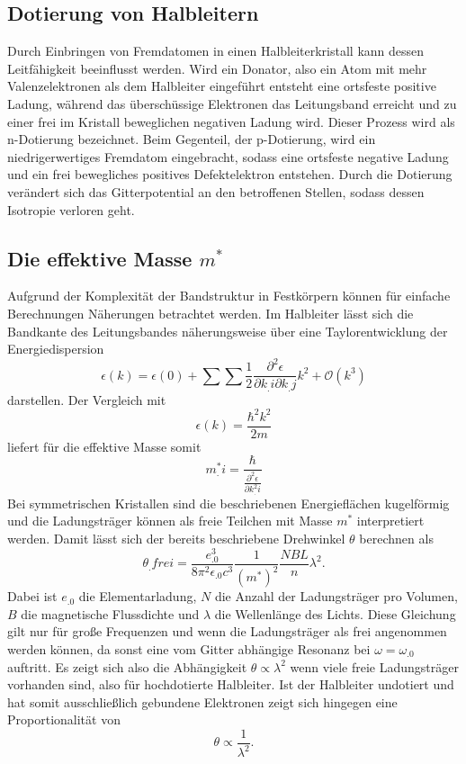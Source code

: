 \subsection{Dotierung von Halbleitern}
Durch Einbringen von Fremdatomen in einen Halbleiterkristall kann dessen Leitfähigkeit beeinflusst werden. Wird ein Donator, also ein Atom mit mehr Valenzelektronen als dem Halbleiter eingeführt entsteht eine ortsfeste positive Ladung, während das überschüssige Elektronen das Leitungsband erreicht und zu einer frei im Kristall beweglichen negativen Ladung wird. Dieser Prozess wird als n-Dotierung bezeichnet. Beim Gegenteil, der p-Dotierung, wird ein niedrigerwertiges Fremdatom eingebracht, sodass eine ortsfeste negative Ladung und ein frei bewegliches positives Defektelektron entstehen. Durch die Dotierung verändert sich das Gitterpotential an den betroffenen Stellen, sodass dessen Isotropie verloren geht.

\subsection{Die effektive Masse $m^*$}
Aufgrund der Komplexität der Bandstruktur in Festkörpern können für einfache Berechnungen Näherungen betrachtet werden.
Im Halbleiter lässt sich die Bandkante des Leitungsbandes näherungsweise über eine Taylorentwicklung der Energiedispersion
\begin{equation*}
\epsilon(k) = \epsilon(0) + \sum\sum\frac{1}{2}\frac{\partial^2\epsilon}{\partial k_.i\partial k_.j}k^2 + \mathcal{O}(k^3)
\end{equation*}
darstellen.
Der Vergleich mit
\[
\epsilon(k) = \frac{\hbar^2k^2}{2m}
\]
liefert für die effektive Masse somit
\begin{equation}
m^*_.i = \frac{\hbar}{\frac{\partial^2\epsilon}{\partial k^2_.i}}\label{eq:mstar}
\end{equation}
Bei symmetrischen Kristallen sind die beschriebenen Energieflächen kugelförmig und die Ladungsträger können als freie Teilchen mit Masse $m^*$ interpretiert werden.
Damit lässt sich der bereits beschriebene Drehwinkel $\theta$ berechnen als
\begin{equation}
\theta_.{frei} = \frac{e^3_.0}{8\pi^2\epsilon_.0c^3}\frac{1}{(m^*)^2}\frac{NBL}{n}\lambda^2\text{.}\label{eq:theta2}
\end{equation}
Dabei ist $e_.0$ die Elementarladung, $N$ die Anzahl der Ladungsträger pro Volumen, $B$ die magnetische Flussdichte und $\lambda$ die Wellenlänge des Lichts.
Diese Gleichung gilt nur für große Frequenzen und wenn die Ladungsträger als frei angenommen werden können, da sonst eine vom Gitter abhängige Resonanz bei $\omega=\omega_.0$ auftritt.
Es zeigt sich also die Abhängigkeit $\theta\propto \lambda^2$ wenn viele freie Ladungsträger vorhanden sind, also für hochdotierte Halbleiter. Ist der Halbleiter undotiert und hat somit ausschließlich gebundene Elektronen zeigt sich hingegen eine Proportionalität von
\begin{equation}
\theta\propto\frac{1}{\lambda^2}\text{.}\label{eq:theta3}
\end{equation}



